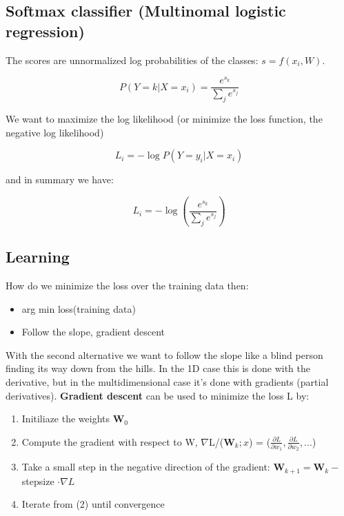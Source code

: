 \subsection*{Softmax classifier (Multinomal logistic regression)}
The scores are unnormalized log probabilities of the classes: $s = f(x_i,W)$.

	\begin{equation}
		P(Y=k | X = x_i) = \frac{e^{s_k}} {\sum_{j}^{} e^{s_j}} 
	\end{equation}

We want to maximize the log likelihood (or minimize the loss function, the negative log likelihood)


	\begin{equation}
		L_i = -\log P(Y=y_i | X = x_i)
	\end{equation}

and in summary we have:

	\begin{equation}
		L_i = - \log (\frac{e^{s_k}} {\sum_{j}^{} e^{s_j}} ) 
	\end{equation}


\subsection*{Learning}

How do we minimize the loss over the training data then: 

\begin{itemize}
	\item arg min loss(training data) 
	\item Follow the slope, gradient descent
\end{itemize}


With the second alternative we want to follow the slope like a blind person finding its way down from the hills. In the 1D case this is done with the derivative, but in the multidimensional case it's done with gradients (partial derivatives). \textbf{Gradient descent} can be used to minimize the loss L by:

\begin{enumerate}
	\item Initiliaze the weights $\textbf{W}_0$
	\item Compute the gradient with respect to W, $\nabla$L/($\textbf{W}_k;x$) = ($ \frac{\partial L} {\partial w_1}, \frac{\partial L} {\partial w_2}, ...$)
	\item Take a small step in the negative direction of the gradient: $\textbf{W}_{k+1} = \textbf{W}_k-$ stepsize $\cdot \nabla L$
	\item Iterate from (2) until convergence
\end{enumerate}

